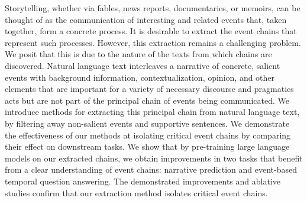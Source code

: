 Storytelling, whether via fables, news reports, documentaries, or memoirs, can be thought of as the communication of interesting and related events that, taken together, form a concrete process. It is desirable to extract the event chains that represent such processes. However, this extraction remains a challenging problem. We posit that this is due to the nature of the texts from which chains are discovered. Natural language text interleaves a narrative of concrete, salient events with background information, contextualization, opinion, and other elements that are important for a variety of necessary discourse and pragmatics acts but are not part of the principal chain of events being communicated. We introduce methods for extracting this principal chain from natural language text, by filtering away non-salient events and supportive sentences. We demonstrate the effectiveness of our methods at isolating critical event chains by comparing their effect on downstream tasks. We show that by pre-training large language models on our extracted chains, we obtain improvements in two tasks that benefit from a clear understanding of event chains: narrative prediction and event-based temporal question answering. The demonstrated improvements and ablative studies confirm that our extraction method isolates critical event chains.
